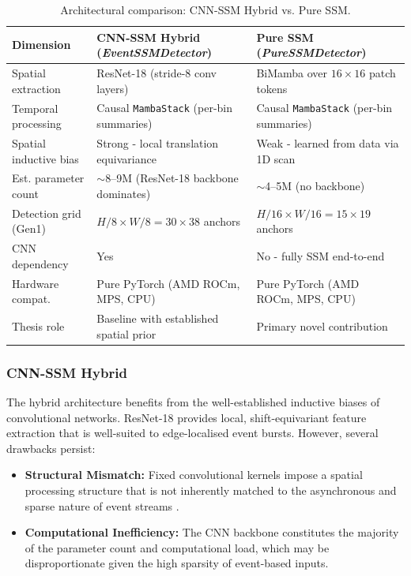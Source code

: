 \documentclass[11pt, a4paper]{report}
\begin{document}
\begin{table}[h!]
    \centering
    \caption{Architectural comparison: CNN-SSM Hybrid vs. Pure SSM.}
    \label{tab:arch_comparison}
    \renewcommand{\arraystretch}{1.5} %
    \begin{tabularx}{\textwidth}{|l|X|X|}
        \hline
        \rowcolor[gray]{0.9} \textbf{Dimension} & \textbf{CNN-SSM Hybrid (\textit{EventSSMDetector})} & \textbf{Pure SSM (\textit{PureSSMDetector})} \\ \hline
        Spatial extraction & ResNet-18 (stride-8 conv layers) & BiMamba over $16 \times 16$ patch tokens \\ \hline
        Temporal processing & Causal \texttt{MambaStack} (per-bin summaries) & Causal \texttt{MambaStack} (per-bin summaries)  \\ \hline
        Spatial inductive bias & Strong - local translation equivariance & Weak - learned from data via 1D scan  \\ \hline
        Est. parameter count & $\sim$8--9M (ResNet-18 backbone dominates) & $\sim$4--5M (no backbone)  \\ \hline
        Detection grid (Gen1) & $H/8 \times W/8 = 30 \times 38$ anchors  & $H/16 \times W/16 = 15 \times 19$ anchors  \\ \hline
        CNN dependency & Yes  & No - fully SSM end-to-end  \\ \hline
        Hardware compat. & Pure PyTorch (AMD ROCm, MPS, CPU) & Pure PyTorch (AMD ROCm, MPS, CPU)  \\ \hline
        Thesis role & Baseline with established spatial prior & Primary novel contribution  \\ \hline
    \end{tabularx}
\end{table}

\subsubsection{CNN-SSM Hybrid}
The hybrid architecture benefits from the well-established inductive biases of convolutional networks. ResNet-18 provides local, shift-equivariant feature extraction that is well-suited to edge-localised event bursts. However, several drawbacks persist:
\begin{itemize}
    \item \textbf{Structural Mismatch:} Fixed convolutional kernels impose a spatial processing structure that is not inherently matched to the asynchronous and sparse nature of event streams \cite{floreano2015science, gallego2020event}.
    \item \textbf{Computational Inefficiency:} The CNN backbone constitutes the majority of the parameter count and computational load, which may be disproportionate given the high sparsity of event-based inputs.
\end{itemize}
\end{document}
